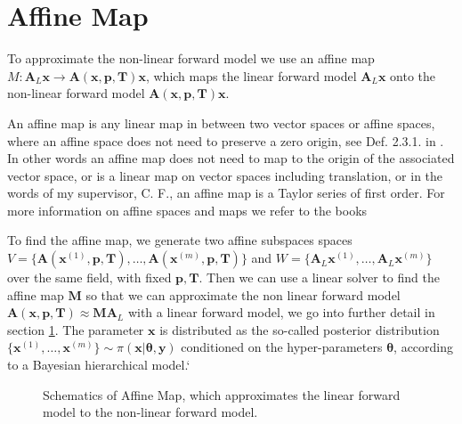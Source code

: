 \section{Affine Map}

To approximate the non-linear forward model we use an affine map $ M:\bm{A}_L \bm{x} \rightarrow \bm{A}(\bm{x},  \bm{p},\bm{T}) \bm{x}$, which maps the linear forward model $\bm{A}_L \bm{x}$ onto the non-linear forward model $\bm{A}(\bm{x},  \bm{p},\bm{T}) \bm{x}$.


An affine map is any linear map in between two vector spaces or affine spaces, where an affine space does not need to preserve a zero origin, see Def. 2.3.1. in \cite{berger2009geometry}.
In other words an affine map does not need to map to the origin of the associated vector space, or is a linear map on vector spaces including translation, or in the words of my supervisor, C. F., an affine map is a Taylor series of first order.
For more information on affine spaces and maps we refer to the books \cite{berger2009geometry, katsumi1994affine}

To find the affine map, we generate two affine subspaces spaces \newline $V = \big\{ \bm{A}(\bm{x}^{(1)}, \bm{p,T}), \dots ,\bm{A}(\bm{x}^{(m)}, \bm{p,T})\big\} $ and $W = \big\{ \bm{A}_L\bm{x}^{(1)}, \dots ,\bm{A}_L\bm{x}^{(m)}\big\}$ over the same field, with fixed $\bm{p,T}$.
Then we can use a linear solver to find the affine map $\bm{M}$ so that we can approximate the non linear forward model $\bm{A}(\bm{x},  \bm{p},\bm{T}) \approx \bm{M} \bm{A}_L$ with a linear forward model, we go into further detail in section \ref{}.
The parameter $\bm{x}$ is distributed as the so-called posterior distribution $\big\{  \bm{x}^{(1)} , \dots, \bm{x}^{(m)} \big\} \sim \pi(\bm{x}|\bm{\theta},\bm{y})$ conditioned on the hyper-parameters $\bm{\theta}$, according to a Bayesian hierarchical model.`


\begin{figure}[ht!]
	\centering
	\caption[Schematics of Affine Map]{Schematics of Affine Map, which approximates the linear forward model to the non-linear forward model.}
\end{figure}

